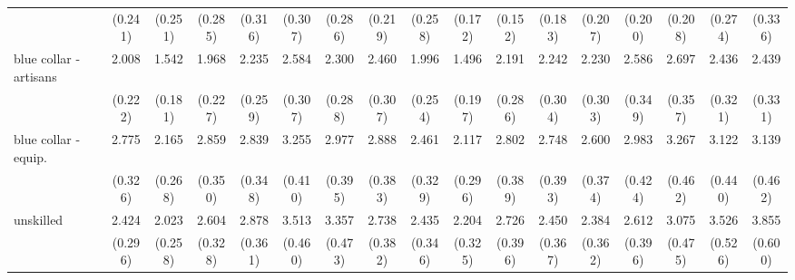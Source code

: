 {\begin{tabular}{l*{16}{c}}
                    &     (0.241)         &     (0.251)         &     (0.285)         &     (0.316)         &     (0.307)         &     (0.286)         &     (0.219)         &     (0.258)         &     (0.172)         &     (0.152)         &     (0.183)         &     (0.207)         &     (0.200)         &     (0.208)         &     (0.274)         &     (0.336)         \\
[1em]
blue collar - artisans&       2.008\sym{***}&       1.542\sym{***}&       1.968\sym{***}&       2.235\sym{***}&       2.584\sym{***}&       2.300\sym{***}&       2.460\sym{***}&       1.996\sym{***}&       1.496\sym{**} &       2.191\sym{***}&       2.242\sym{***}&       2.230\sym{***}&       2.586\sym{***}&       2.697\sym{***}&       2.436\sym{***}&       2.439\sym{***}\\
                    &     (0.222)         &     (0.181)         &     (0.227)         &     (0.259)         &     (0.307)         &     (0.288)         &     (0.307)         &     (0.254)         &     (0.197)         &     (0.286)         &     (0.304)         &     (0.303)         &     (0.349)         &     (0.357)         &     (0.321)         &     (0.331)         \\
[1em]
blue collar - equip.&       2.775\sym{***}&       2.165\sym{***}&       2.859\sym{***}&       2.839\sym{***}&       3.255\sym{***}&       2.977\sym{***}&       2.888\sym{***}&       2.461\sym{***}&       2.117\sym{***}&       2.802\sym{***}&       2.748\sym{***}&       2.600\sym{***}&       2.983\sym{***}&       3.267\sym{***}&       3.122\sym{***}&       3.139\sym{***}\\
                    &     (0.326)         &     (0.268)         &     (0.350)         &     (0.348)         &     (0.410)         &     (0.395)         &     (0.383)         &     (0.329)         &     (0.296)         &     (0.389)         &     (0.393)         &     (0.374)         &     (0.424)         &     (0.462)         &     (0.440)         &     (0.462)         \\
[1em]
unskilled           &       2.424\sym{***}&       2.023\sym{***}&       2.604\sym{***}&       2.878\sym{***}&       3.513\sym{***}&       3.357\sym{***}&       2.738\sym{***}&       2.435\sym{***}&       2.204\sym{***}&       2.726\sym{***}&       2.450\sym{***}&       2.384\sym{***}&       2.612\sym{***}&       3.075\sym{***}&       3.526\sym{***}&       3.855\sym{***}\\
                    &     (0.296)         &     (0.258)         &     (0.328)         &     (0.361)         &     (0.460)         &     (0.473)         &     (0.382)         &     (0.346)         &     (0.325)         &     (0.396)         &     (0.367)         &     (0.362)         &     (0.396)         &     (0.475)         &     (0.526)         &     (0.600)         \\

\end{tabular}}
